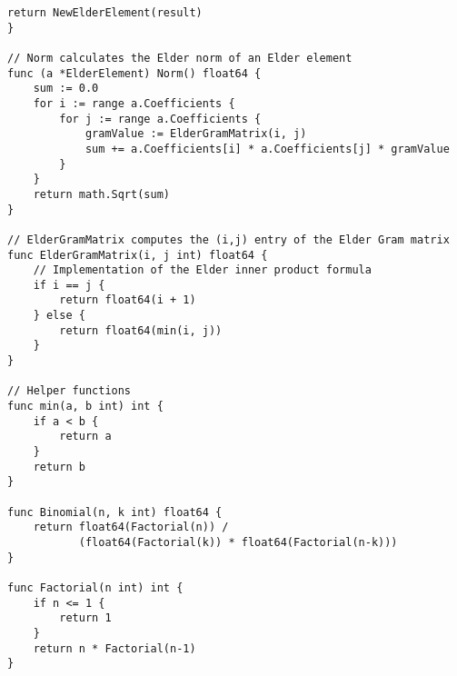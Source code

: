 \begin{lstlisting}[language=golang, caption={Implementation of Elder Algebra in GoLang}]
    return NewElderElement(result)
}

// Norm calculates the Elder norm of an Elder element
func (a *ElderElement) Norm() float64 {
    sum := 0.0
    for i := range a.Coefficients {
        for j := range a.Coefficients {
            gramValue := ElderGramMatrix(i, j)
            sum += a.Coefficients[i] * a.Coefficients[j] * gramValue
        }
    }
    return math.Sqrt(sum)
}

// ElderGramMatrix computes the (i,j) entry of the Elder Gram matrix
func ElderGramMatrix(i, j int) float64 {
    // Implementation of the Elder inner product formula
    if i == j {
        return float64(i + 1)
    } else {
        return float64(min(i, j))
    }
}

// Helper functions
func min(a, b int) int {
    if a < b {
        return a
    }
    return b
}

func Binomial(n, k int) float64 {
    return float64(Factorial(n)) / 
           (float64(Factorial(k)) * float64(Factorial(n-k)))
}

func Factorial(n int) int {
    if n <= 1 {
        return 1
    }
    return n * Factorial(n-1)
}
\end{lstlisting}

